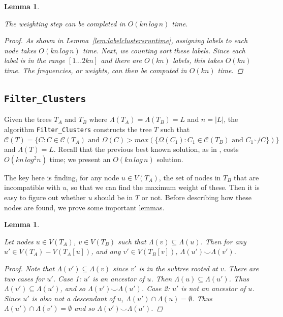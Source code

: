 \documentclass{article}
\newcommand{\compatible}{\smile}
\newcommand{\leafset}{\Lambda}
\newtheorem{weightingruntime}[incompatibility]{Lemma}
\newtheorem{filterclusterssubsetcompatible}[incompatibility]{Lemma}
\begin{document}
    \medskip
    \begin{weightingruntime}
        \label{lem:weightingruntime}

        The weighting step can be completed in $O(kn\,log\,n)$ time.

        \begin{proof}
            As shown in Lemma~\ref{lem:labelclustersruntime}, assigning labels to each node takes $O(kn\,log\,n)$ time. Next, we counting sort these labels. Since each label is in the range $[1 ... 2kn]$ and there are $O(kn)$ labels, this takes $O(kn)$ time. The frequencies, or weights, can then be computed in $O(kn)$ time.
        \end{proof}
    \end{weightingruntime}

    \subsection{\texttt{Filter\_Clusters}}
    \label{subsec:filterclusters}

    Given the trees $T_A$ and $T_B$ where $\leafset(T_A) = \leafset(T_B) = L$ and $n = |L|$, the algorithm \texttt{Filter\_Clusters} constructs the tree $T$ such that $\mathcal{C}(T) = \{C : C \in \mathcal{C}(T_A) \text{ and } \Omega(C) > max(\{\Omega(C_1) : C_1 \in \mathcal{C}(T_B) \text{ and } C_1 \not\compatible C\})\}$ and $\leafset(T) = L$. Recall that the previous best known solution, as in \cite{jansson2018algorithms}, costs $O(kn\,log^2n)$ time; we present an $O(kn\,log\,n)$ solution.

    The key here is finding, for any node $u \in V(T_A)$, the set of nodes in $T_B$ that are incompatible with $u$, so that we can find the maximum weight of these. Then it is easy to figure out whether $u$ should be in $T$ or not. Before describing how these nodes are found, we prove some important lemmas.
    \newline

    \begin{filterclusterssubsetcompatible}
        \label{lem:filterclusterssubsetcompatible}

        Let nodes $u \in V(T_A)$, $v \in V(T_B)$ such that $\leafset(v) \subseteq \leafset(u)$. Then for any $u' \in V(T_A) - V(T_A[u])$, and any $v' \in V(T_B[v])$, $\leafset(u') \compatible \leafset(v')$.

        \begin{proof}
            Note that $\leafset(v') \subseteq \leafset(v)$ since $v'$ is in the subtree rooted at $v$. There are two cases for $u'$. \textit{Case 1}: $u'$ is an ancestor of $u$. Then $\leafset(u) \subseteq \leafset(u')$. Thus $\leafset(v') \subseteq \leafset(u')$, and so $\leafset(v') \compatible \leafset(u')$. \textit{Case 2}: $u'$ is not an ancestor of $u$. Since $u'$ is also not a descendant of $u$, $\leafset(u') \cap \leafset(u) = \emptyset$. Thus $\leafset(u') \cap \leafset(v') = \emptyset$ and so $\leafset(v') \compatible \leafset(u')$.
        \end{proof}
    \end{filterclusterssubsetcompatible}
\end{document}
